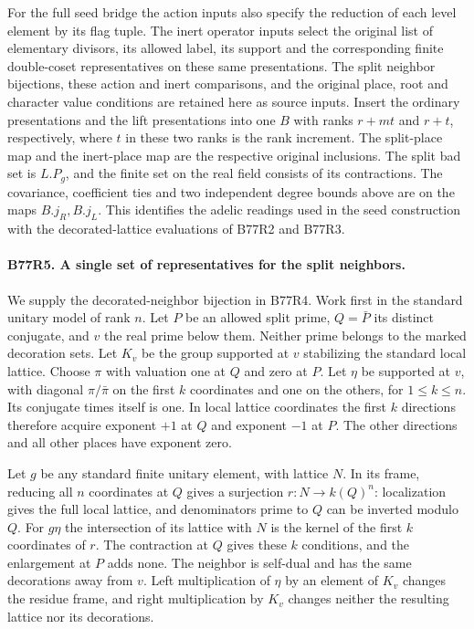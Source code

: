 For the full seed bridge the action inputs also specify the
reduction of each level element by its flag tuple. The inert
operator inputs select the original list of elementary divisors,
its allowed label, its support and the corresponding finite
double-coset representatives on these same presentations.
The split neighbor bijections, these action and inert comparisons,
and the original place, root and character value conditions are
retained here as source inputs. Insert the ordinary presentations
and the lift presentations into one $B$ with ranks $r+mt$ and
$r+t$, respectively, where $t$ in these two ranks is the rank
increment. The split-place map and the inert-place map are the
respective original inclusions. The split bad set is $L.P_g$,
and the finite set on the real field consists of its contractions.
The covariance, coefficient ties and two independent degree
bounds above are on the maps $B.j_R,B.j_L$. This identifies the
adelic readings used in the seed construction with the
decorated-lattice evaluations of B77R2 and B77R3.

\paragraph{B77R5. A single set of representatives for the split neighbors.}
We supply the decorated-neighbor bijection in B77R4. Work first in
the standard unitary model of rank $n$. Let $P$ be an allowed split
prime, $Q=\bar P$ its distinct conjugate, and $v$ the real prime
below them. Neither prime belongs to the marked decoration sets.
Let $K_v$ be the group supported at $v$ stabilizing the standard
local lattice. Choose $\pi$ with valuation one at $Q$ and zero
at $P$. Let $\eta$ be supported at $v$, with diagonal
$\pi/\bar\pi$ on the first $k$ coordinates and one on the others,
for $1\le k\le n$. Its conjugate times itself is one. In local
lattice coordinates the first $k$ directions therefore acquire
exponent $+1$ at $Q$ and exponent $-1$ at $P$. The other directions
and all other places have exponent zero.

Let $g$ be any standard finite unitary element, with lattice $N$.
In its frame, reducing all $n$ coordinates at $Q$ gives a
surjection $r:N\to k(Q)^n$: localization gives the full local
lattice, and denominators prime to $Q$ can be inverted modulo $Q$.
For $g\eta$ the intersection of its lattice with $N$ is the kernel
of the first $k$ coordinates of $r$. The contraction at $Q$ gives
these $k$ conditions, and the enlargement at $P$ adds none. The
neighbor is self-dual and has the same decorations away from $v$.
Left multiplication of $\eta$ by an element of $K_v$ changes the
residue frame, and right multiplication by $K_v$ changes neither
the resulting lattice nor its decorations.

